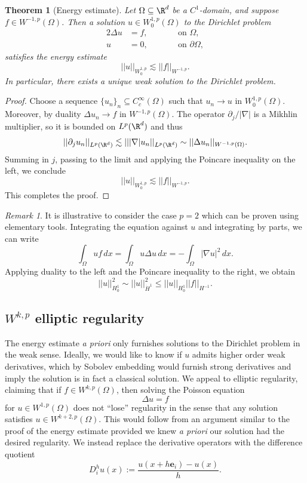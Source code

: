 \documentclass[reqno]{amsart}
\newtheorem{theorem}{Theorem}
\theoremstyle{definition}
\theoremstyle{remark}
\newtheorem*{remark}{Remark}
\newcounter{problem}[section]	\declaretheorem[style=thmrecbox,name=Problem, numberlike=problem]{statement}
\let\vec\mathbf
\begin{document}
\begin{theorem}[Energy estimate]
	Let $\Omega \subseteq \R^d$ be a $C^1$-domain, and suppose $f \in W^{-1,p} (\Omega)$. Then a solution $u \in W^{1, p}_0 (\Omega)$ to the Dirichlet problem
		\begin{alignat*}{2}
		\Delta u
			&= f, \qquad  && \text{on } \Omega, \\
		u
			&= 0,	\qquad && \text{on } \partial \Omega,
	\end{alignat*} 
	satisfies the energy estimate
		\[ || u||_{W^{1, p}_0} \lesssim || f ||_{W^{-1, p}}. \]
	In particular, there exists a unique weak solution to the Dirichlet problem. 	
\end{theorem}

\begin{proof}
	Choose a sequence $\{ u_n \}_n \subseteq C^\infty_c (\Omega)$ such that $u_n \to u$ in $W^{1 ,p}_0 (\Omega)$. Moreover, by duality $\Delta u_n \to f$ in $W^{-1, p} (\Omega)$. The operator $\partial_j/|\nabla|$ is a Mikhlin multiplier, so it is bounded on $L^p (\R^d)$ and thus
		\[ || \partial_j u_n ||_{L^p (\R^d)} \lesssim || |\nabla| u_n||_{L^p (\R^d)} \sim || \Delta u_n||_{W^{-1, p} (\Omega)} . \]
	Summing in $j$, passing to the limit and applying the Poincare inequality on the left, we conclude
		\[ || u ||_{W^{1, p}_0} \lesssim || f||_{W^{-1, p}}. \]	
	This completes the proof. 	
\end{proof}

\begin{remark}
	It is illustrative to consider the case $p = 2$ which can be proven using elementary tools. Integrating the equation against $u$ and integrating by parts, we can write
		\[ \int_\Omega u f \, dx = \int_\Omega u \Delta u \, dx = - \int_\Omega |\nabla u|^2 \, dx. \]
	Applying duality to the left and the Poincare inequality to the right, we obtain
		\[ ||u||_{H^1_0}^2 \sim ||u||_{\dot H^1}^2 \leq || u ||_{H^1_0} ||f||_{H^{-1}}. \]	
\end{remark}

\subsection{$W^{k, p}$ elliptic regularity}

The energy estimate \textit{a priori} only furnishes solutions to the Dirichlet problem in the weak sense. Ideally, we would like to know if $u$ admits higher order weak derivatives, which by Sobolev embedding would furnish strong derivatives and imply the solution is in fact a classical solution. We appeal to elliptic regularity, claiming that if $f \in W^{k, p} (\Omega)$, then solving the Poisson equation
	\[ \Delta u = f \]
for $u \in W^{1, p} (\Omega)$ does not ``lose'' regularity in the sense that any solution satisfies $u \in W^{k + 2, p} (\Omega)$. This would follow from an argument similar to the proof of the energy estimate provided we knew \textit{a priori} our solution had the desired regularity. We instead replace the derivative operators with the difference quotient
	\[ D^h_i u (x) := \frac{u(x + h \vec e_i) - u(x)}{h}. \]
\end{document}
